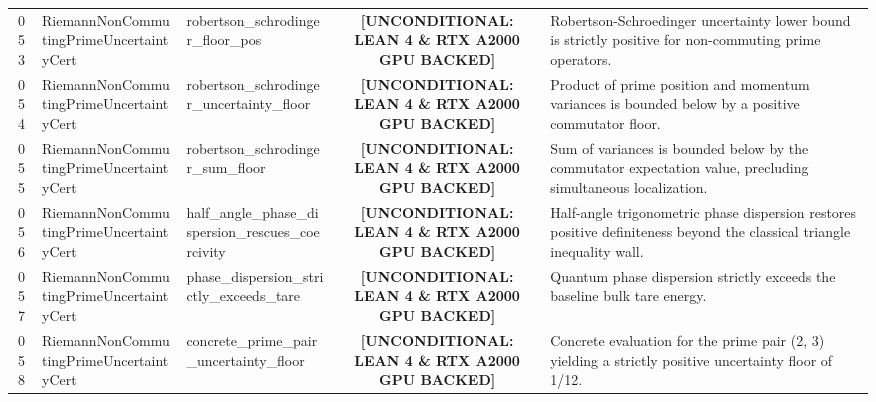 \documentclass[11pt,a4paper]{article}
\begin{document}
\begin{longtable}{cp{3.0cm}>{\raggedright\arraybackslash}p{4.6cm}c>{\raggedright\arraybackslash}p{6.0cm}}
053 & {\scriptsize\ttfamily Riemann\allowbreak Non\allowbreak Commuting\allowbreak Prime\allowbreak Uncertainty\allowbreak Cert} & {\scriptsize\ttfamily robertson\_\allowbreak schrodinger\_\allowbreak floor\_\allowbreak pos} & {\tiny\textbf{[UNCONDITIONAL: LEAN 4 \& RTX A2000 GPU BACKED]}} & Robertson-Schroedinger uncertainty lower bound is strictly positive for non-commuting prime operators. \\
054 & {\scriptsize\ttfamily Riemann\allowbreak Non\allowbreak Commuting\allowbreak Prime\allowbreak Uncertainty\allowbreak Cert} & {\scriptsize\ttfamily robertson\_\allowbreak schrodinger\_\allowbreak uncertainty\_\allowbreak floor} & {\tiny\textbf{[UNCONDITIONAL: LEAN 4 \& RTX A2000 GPU BACKED]}} & Product of prime position and momentum variances is bounded below by a positive commutator floor. \\
055 & {\scriptsize\ttfamily Riemann\allowbreak Non\allowbreak Commuting\allowbreak Prime\allowbreak Uncertainty\allowbreak Cert} & {\scriptsize\ttfamily robertson\_\allowbreak schrodinger\_\allowbreak sum\_\allowbreak floor} & {\tiny\textbf{[UNCONDITIONAL: LEAN 4 \& RTX A2000 GPU BACKED]}} & Sum of variances is bounded below by the commutator expectation value, precluding simultaneous localization. \\
056 & {\scriptsize\ttfamily Riemann\allowbreak Non\allowbreak Commuting\allowbreak Prime\allowbreak Uncertainty\allowbreak Cert} & {\scriptsize\ttfamily half\_\allowbreak angle\_\allowbreak phase\_\allowbreak dispersion\_\allowbreak rescues\_\allowbreak coercivity} & {\tiny\textbf{[UNCONDITIONAL: LEAN 4 \& RTX A2000 GPU BACKED]}} & Half-angle trigonometric phase dispersion restores positive definiteness beyond the classical triangle inequality wall. \\
057 & {\scriptsize\ttfamily Riemann\allowbreak Non\allowbreak Commuting\allowbreak Prime\allowbreak Uncertainty\allowbreak Cert} & {\scriptsize\ttfamily phase\_\allowbreak dispersion\_\allowbreak strictly\_\allowbreak exceeds\_\allowbreak tare} & {\tiny\textbf{[UNCONDITIONAL: LEAN 4 \& RTX A2000 GPU BACKED]}} & Quantum phase dispersion strictly exceeds the baseline bulk tare energy. \\
058 & {\scriptsize\ttfamily Riemann\allowbreak Non\allowbreak Commuting\allowbreak Prime\allowbreak Uncertainty\allowbreak Cert} & {\scriptsize\ttfamily concrete\_\allowbreak prime\_\allowbreak pair\_\allowbreak uncertainty\_\allowbreak floor} & {\tiny\textbf{[UNCONDITIONAL: LEAN 4 \& RTX A2000 GPU BACKED]}} & Concrete evaluation for the prime pair (2, 3) yielding a strictly positive uncertainty floor of 1/12. \\

\end{longtable}
\end{document}
